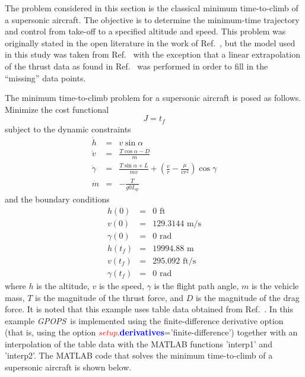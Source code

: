 \documentclass[10pt]{article}
\newcommand{\gpops}{{\em GPOPS}~}
\newenvironment{shadedframe}{%
  \def\FrameCommand{\fcolorbox{black}{shadecolor}}%
  \MakeFramed {\FrameRestore}}
{\endMakeFramed}
\newcommand{\bfblue}[1]{\textcolor{blue}{\bf #1}}
\newcommand{\slred}[1]{\textcolor{red}{\sl #1}}
\begin{document}
The problem considered in this section is the classical minimum
time-to-climb of a supersonic aircraft.  The objective is to determine
the minimum-time trajectory and control from take-off to a specified
altitude and speed.  This problem was originally stated in the open
literature in the work of Ref.~, but the model used in
this study was taken from Ref.~ with the exception that
a linear extrapolation of the thrust data as found in
Ref.~ was performed in order to fill in the ``missing'' 
data points.

The minimum time-to-climb problem for a supersonic aircraft is posed
as follows.  Minimize the cost functional
\begin{equation}
  J = t_f
\end{equation}
subject to the dynamic constraints
\begin{eqnarray}
  \dot{h} & = & v\sin\alpha \\
  \dot{v} & = & \frac{T\cos\alpha-D}{m} \\
 \dot{\gamma} & = & \frac{T\sin\alpha+L}{mv}+\left(\frac{v}{r}-\frac{\mu}{vr^2}\right)\cos\gamma\\
 \dot{m} & =&  -\frac{T}{g0 I_{sp}} 
\end{eqnarray}
and the boundary conditions
\begin{eqnarray}
  h(0) & = & 0 \textrm{ ft} \\
  v(0) & = & 129.3144 \textrm{ m/s} \\
  \gamma(0) & = & 0 \textrm{ rad} \\
  h(t_f) & = & 19994.88 \textrm{ m} \\
  v(t_f) & = & 295.092 \textrm{ ft/s} \\
  \gamma(t_f) & = & 0 \textrm{ rad}
\end{eqnarray}
where $h$ is the altitude, $v$ is the speed, $\gamma$ is the
flight path angle, $m$ is the vehicle mass, $T$ is the magnitude of
the thrust force, and $D$ is the magnitude of the drag force.  It is
noted that this example uses table data obtained from
Ref.~.  In this example \gpops is implemented using the
finite-difference derivative option (that is, using the option
\slred{setup}.\bfblue{derivatives}='finite-difference') together with an interpolation of the
table data with the MATLAB functions 'interp1' and 'interp2'.   The
MATLAB code that solves the minimum time-to-climb of a supersonic 
aircraft is shown below.
\scriptsize
\begin{shadedframe}




\end{shadedframe}
\end{document}
